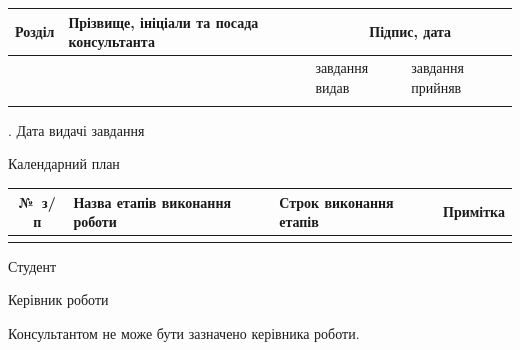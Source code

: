 \begin{center}
  \begin{tabularx}{\textwidth}{|X|X|X|X|}
    \hline
    Розділ & Прізвище, ініціали та посада консультанта &
      \multicolumn{2}{c|}{Підпис, дата} \\
    \hline
    & & завдання видав & завдання прийняв \\
    \hline
    & & & \\
    \hline
  \end{tabularx}
\end{center}

. Дата видачі завдання \hrulefill

\begin{center}
  Календарний план
\end{center}

\begin{center}
  \begin{tabularx}{\textwidth}{|c|X|X|X|}
    \hline
    №~з/п & Назва етапів виконання роботи &
      Строк виконання етапів & Примітка \\
    \hline
    & & & \\
    \hline
  \end{tabularx}
\end{center}

\vspace{1em}
\noindent Студент \hfill \authorFullName

\noindent Керівник роботи \hfill \supervisorFullName

\vspace{1em}
{\small * Консультантом не може бути зазначено керівника роботи.}

\clearpage
